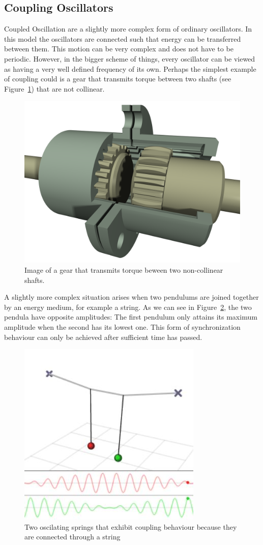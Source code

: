 \subsection{Coupling Oscillators}
Coupled Oscillation are a slightly more complex form of ordinary oscillators. In this model the oscillators are connected such that energy can be transferred between them. This motion can be very complex and does not have to be periodic. However, in the bigger scheme of things, every oscillator can be viewed as having a very well defined frequency of its own. Perhaps the simplest example of coupling could is a gear that transmits torque between two shafts (see Figure~\ref{fig:intro_gear}) that are not collinear. 

\begin{figure}[h]
  \centering
  \includegraphics[width=.5\textwidth]{imgs/gear}
  \caption{Image of a gear that transmits torque beween two non-collinear shafts. }
  \label{fig:intro_gear}
\end{figure}

A slightly more complex situation arises when two pendulums are joined together by an energy medium, for example a string. As we can see in Figure~\ref{fig:intro_couple}, the two pendula have opposite amplitudes: The first pendulum only attains its maximum amplitude when the second has its lowest one. This form of synchronization behaviour can only be achieved after sufficient time has passed. 

\begin{figure}[h]
\centering
\includegraphics[width=.5\textwidth]{imgs/couple}
\caption{Two oscilating springs that exhibit coupling behaviour because they are connected through a string}
\label{fig:intro_couple}
\end{figure}

